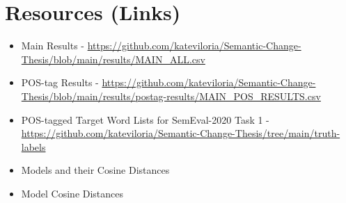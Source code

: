 \section{Resources (Links)}
\label{app-resources}


\begin{itemize}

  \item Main Results - \url{https://github.com/kateviloria/Semantic-Change-Thesis/blob/main/results/MAIN_ALL.csv}
  \item POS-tag Results - \url{https://github.com/kateviloria/Semantic-Change-Thesis/blob/main/results/postag-results/MAIN_POS_RESULTS.csv}
  \item POS-tagged Target Word Lists for SemEval-2020 Task 1 - \url{https://github.com/kateviloria/Semantic-Change-Thesis/tree/main/truth-labels}
  \item Models and their Cosine Distances
  \item Model Cosine Distances
\end{itemize}